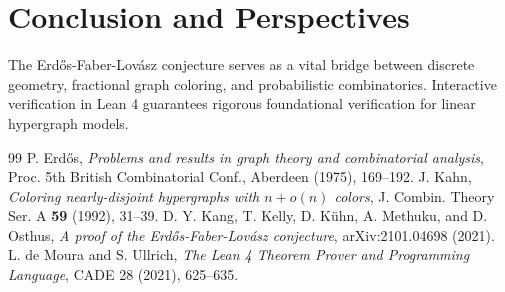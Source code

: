 \documentclass[11pt,a4paper]{article}
\theoremstyle{definition}
\begin{document}
\section{Conclusion and Perspectives}
The Erd\H{o}s-Faber-Lov\'asz conjecture serves as a vital bridge between discrete geometry, fractional graph coloring, and probabilistic combinatorics. Interactive verification in Lean 4 guarantees rigorous foundational verification for linear hypergraph models.

\begin{thebibliography}{99}
 P. Erd\H{o}s, \textit{Problems and results in graph theory and combinatorial analysis}, Proc. 5th British Combinatorial Conf., Aberdeen (1975), 169--192.
 J. Kahn, \textit{Coloring nearly-disjoint hypergraphs with $n + o(n)$ colors}, J. Combin. Theory Ser. A \textbf{59} (1992), 31--39.
 D. Y. Kang, T. Kelly, D. K\"uhn, A. Methuku, and D. Osthus, \textit{A proof of the Erd\H{o}s-Faber-Lov\'asz conjecture}, arXiv:2101.04698 (2021).
 L. de Moura and S. Ullrich, \textit{The Lean 4 Theorem Prover and Programming Language}, CADE 28 (2021), 625--635.
\end{thebibliography}
\end{document}
